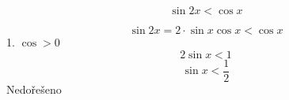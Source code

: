 \documentclass[12pt]{article}					%
\begin{document}
        \begin{priklad}
            $$ \sin 2x < \cos x $$
            \begin{reseni}
                 $$ \sin 2x = 2\cdot \sin x \cos x < \cos x $$
                 1. $\cos > 0$
                 $$ 2 \sin x < 1 $$ 
                 $$ \sin x < \frac{1}{2} $$
                 Nedořešeno
            \end{reseni}
                
        \end{priklad}
\end{document}
